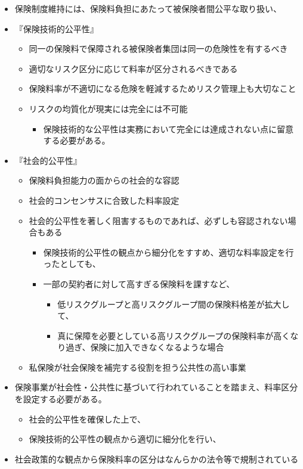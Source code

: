 \documentclass[
]{article}
\providecommand{\tightlist}{%
  \setlength{\itemsep}{0pt}\setlength{\parskip}{0pt}}
\begin{document}
\begin{itemize}
\tightlist
\item
  保険制度維持には、保険料負担にあたって被保険者間公平な取り扱い、
\item
  『保険技術的公平性』

  \begin{itemize}
  \tightlist
  \item
    同一の保険料で保障される被保険者集団は同一の危険性を有するべき
  \item
    適切なリスク区分に応じて料率が区分されるべきである
  \item
    保険料率が不適切になる危険を軽減するためリスク管理上も大切なこと
  \item
    リスクの均質化が現実には完全には不可能

    \begin{itemize}
    \tightlist
    \item
      保険技術的な公平性は実務において完全には達成されない点に留意する必要がある。
    \end{itemize}
  \end{itemize}
\item
  『社会的公平性』

  \begin{itemize}
  \tightlist
  \item
    保険料負担能力の面からの社会的な容認
  \item
    社会的コンセンサスに合致した料率設定
  \item
    社会的公平性を著しく阻害するものであれば、必ずしも容認されない場合もある

    \begin{itemize}
    \tightlist
    \item
      保険技術的公平性の観点から細分化をすすめ、適切な料率設定を行ったとしても、
    \item
      一部の契約者に対して高すぎる保険料を課すなど、

      \begin{itemize}
      \tightlist
      \item
        低リスクグループと高リスクグループ間の保険料格差が拡大して、
      \item
        真に保障を必要としている高リスクグループの保険料率が高くなり過ぎ、保険に加入できなくなるような場合
      \end{itemize}
    \end{itemize}
  \item
    私保険が社会保険を補完する役割を担う公共性の高い事業
  \end{itemize}
\item
  保険事業が社会性・公共性に基づいて行われていることを踏まえ、料率区分を設定する必要がある。

  \begin{itemize}
  \tightlist
  \item
    社会的公平性を確保した上で、
  \item
    保険技術的公平性の観点から適切に細分化を行い、
  \end{itemize}
\item
  社会政策的な観点から保険料率の区分はなんらかの法令等で規制されている
\end{itemize}
\end{document}
